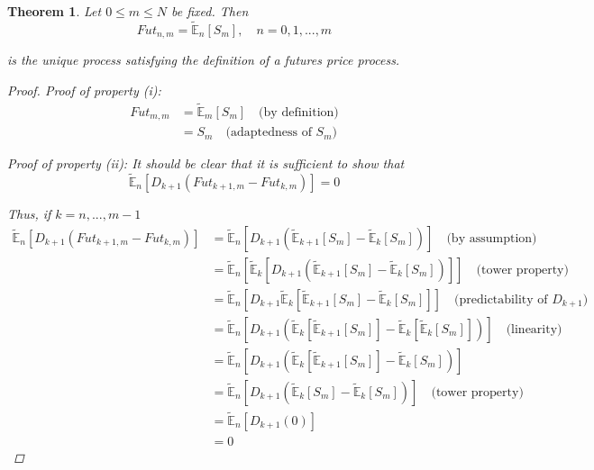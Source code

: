 \documentclass[12pt]{article}
\newtheorem{theorem}{Theorem}
\newcommand{\E}{\mathbb E}
\begin{document}
\begin{theorem} Let $0 \leq m \leq N$ be fixed. Then
\begin{equation*}
	Fut_{n,m} = \tilde{\E}_n[S_m], \quad n = 0,1,...,m
\end{equation*}

is the unique process satisfying the definition of a futures price process.

\begin{proof} {\em Proof of property (i)}:
\begin{align*}
	Fut_{m,m} &= \tilde{\E}_m[S_m] \quad \text{(by definition)} \\
	&= S_m \quad \text{(adaptedness of $S_m$)}
\end{align*}

{\em Proof of property (ii)}: It should be clear that it is sufficient to show that
\begin{equation*}
	\tilde{\E}_n \left[ D_{k + 1} \left( Fut_{k + 1,m} - Fut_{k,m} \right) \right] = 0
\end{equation*} 

Thus, if $k = n,...,m - 1$
\begin{align*}
	\tilde{\E}_n \left[ D_{k + 1} \left( Fut_{k + 1,m} - Fut_{k,m} \right) \right] &= \tilde{\E}_n \left[ D_{k + 1} \left( \tilde{\E}_{k + 1}[S_m] - \tilde{\E}_k[S_m] \right) \right] \quad \text{(by assumption)} \\
	&= \tilde{\E}_n \left[ \tilde{\E}_k \left[ D_{k + 1} \left( \tilde{\E}_{k + 1}[S_m] - \tilde{\E}_k[S_m] \right) \right] \right] \quad \text{(tower property)} \\
	&= \tilde{\E}_n \left[ D_{k + 1} \tilde{\E}_k \left[ \tilde{\E}_{k + 1}[S_m] - \tilde{\E}_k[S_m] \right] \right] \quad \text{(predictability of $D_{k + 1}$)} \\
	&= \tilde{\E}_n \left[ D_{k + 1} \left( \tilde{\E}_k \left[ \tilde{\E}_{k + 1}[S_m] \right] - \tilde{\E}_k \left[ \tilde{\E}_k[S_m] \right] \right) \right] \quad \text{(linearity)} \\
	&= \tilde{\E}_n \left[ D_{k + 1} \left( \tilde{\E}_k \left[ \tilde{\E}_{k + 1}[S_m] \right] - \tilde{\E}_k \left[ S_m \right] \right) \right] \\
	&= \tilde{\E}_n \left[ D_{k + 1} \left( \tilde{\E}_k [S_m] - \tilde{\E}_k \left[ S_m \right] \right) \right] \quad \text{(tower property)} \\
	&= \tilde{\E}_n \left[ D_{k + 1} \left( 0 \right) \right] \\
	&= 0
\end{align*}


\end{proof}
\end{theorem}
\end{document}
